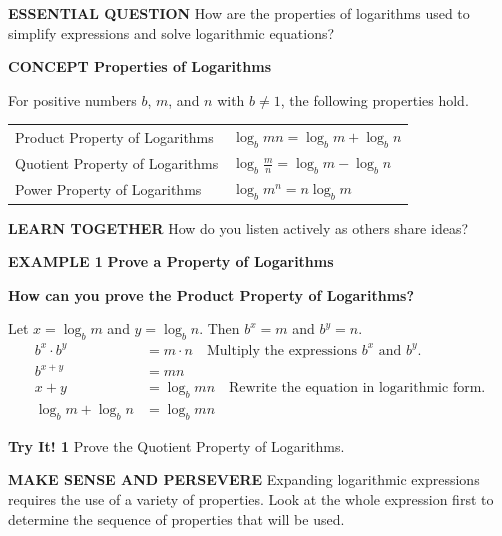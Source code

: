 \documentclass{article}
\newenvironment{concept-box}{}{}
\newenvironment{example}[1]{\textbf{EXAMPLE #1}}{}
\newenvironment{tryit}[1]{\textbf{Try It! #1}}{}
\newcommand{\answer}[1]{}
\begin{document}
\textbf{ESSENTIAL QUESTION} How are the properties of logarithms used to simplify expressions and solve logarithmic equations?

\begin{concept-box}
\textbf{CONCEPT Properties of Logarithms}

For positive numbers $b$, $m$, and $n$ with $b \neq 1$, the following properties hold.

\begin{tabular}{ll}
Product Property of Logarithms & $\log_b{mn} = \log_b{m} + \log_b{n}$ \\
Quotient Property of Logarithms & $\log_b{\frac{m}{n}} = \log_b{m} - \log_b{n}$ \\
Power Property of Logarithms & $\log_b{m^n} = n\log_b{m}$
\end{tabular}
\end{concept-box}

\vspace{1em}
\textbf{LEARN TOGETHER}
How do you listen actively as others share ideas?

\begin{example}{1}
\textbf{Prove a Property of Logarithms}

\textbf{How can you prove the Product Property of Logarithms?}

Let $x = \log_b{m}$ and $y = \log_b{n}$. Then $b^x = m$ and $b^y = n$.
\begin{align*}
b^x \cdot b^y &= m \cdot n \quad \text{Multiply the expressions } b^x \text{ and } b^y. \\
b^{x+y} &= mn \\
x + y &= \log_b{mn} \quad \text{Rewrite the equation in logarithmic form.} \\
\log_b{m} + \log_b{n} &= \log_b{mn}
\end{align*}
\end{example}

\begin{tryit}{1}
Prove the Quotient Property of Logarithms.
\answer{Let $x = \log_b m$ and $y = \log_b n$. Then $b^x = m$ and $b^y = n$. $\frac{b^x}{b^y} = \frac{m}{n} \implies b^{x-y} = \frac{m}{n} \implies \log_b\left(\frac{m}{n}\right) = x - y \implies \log_b\left(\frac{m}{n}\right) = \log_b m - \log_b n$.}
\end{tryit}

\vspace{1em}
\textbf{MAKE SENSE AND PERSEVERE}
Expanding logarithmic expressions requires the use of a variety of properties. Look at the whole expression first to determine the sequence of properties that will be used.
\end{document}
